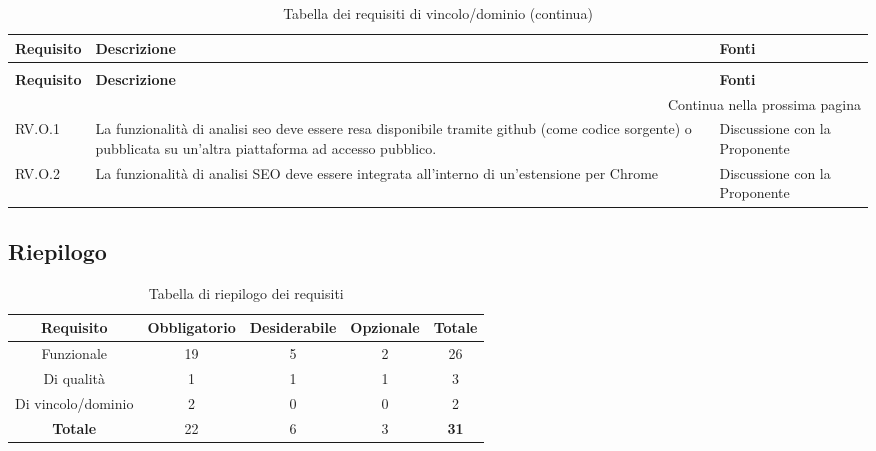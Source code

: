 \renewcommand{\arraystretch}{1.5}
\begin{longtable}{p{}p{}p{}}
\caption{Tabella dei requisti di vincolo/dominio}
\label{tab:requisiti-vincolo} \\
\hline\hline
\textbf{Requisito} & \textbf{Descrizione} & \textbf{Fonti}\\
\endfirsthead
        
\caption[]{Tabella dei requisiti di vincolo/dominio (continua)} \\
\hline\hline
\textbf{Requisito} & \textbf{Descrizione} & \textbf{Fonti} \\ 
\endhead
        
\multicolumn{3}{r}{{Continua nella prossima pagina}} \\ 
\endfoot
        
\hline
\endlastfoot

\hline
RV.O.1 & La funzionalità di analisi \gls{seo} deve essere resa disponibile tramite \gls{github} (come codice sorgente) o pubblicata su un'altra piattaforma ad accesso pubblico. & Discussione con la Proponente \\
\hline
RV.O.2 & La funzionalità di analisi SEO deve essere integrata all'interno di un'estensione per Chrome & Discussione con la Proponente \\
\end{longtable}

\par\vspace{20pt}

\subsection{Riepilogo}

\begin{table}[H]
\centering
\caption{Tabella di riepilogo dei requisiti}
\label{tab:riepilogo-requisiti}
\begin{tabular}{ccccc}
\hline\hline
\textbf{Requisito} & \textbf{Obbligatorio} & \textbf{Desiderabile} & \textbf{Opzionale} & \textbf{Totale} \\ 
\hline
Funzionale & 19 & 5 & 2 & 26 \\
\hline
Di qualità & 1 & 1 & 1 & 3 \\
\hline 
Di vincolo/dominio & 2 & 0 & 0 & 2 \\
\hline
\textbf{Totale} & 22 & 6 & 3 & \textbf{31} \\ 
\hline
\end{tabular}
\end{table}

